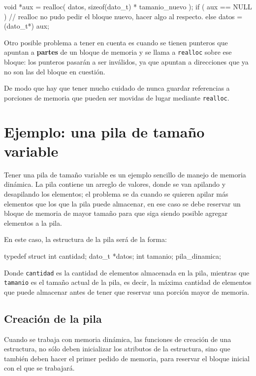\begin{codigo-c-plano}
void *aux = realloc( datos, sizeof(dato_t) * tamanio_nuevo );
if ( aux == NULL ) {
	// realloc no pudo pedir el bloque nuevo, hacer algo al respecto.
} else {
	datos = (dato_t*) aux;
}
\end{codigo-c-plano}

Otro posible problema a tener en cuenta es cuando se tienen punteros que
apuntan a \textbf{partes} de un bloque de memoria y se llama a
\lstinline!realloc! sobre ese bloque: los punteros pasarán a ser inválidos, ya
que apuntan a direcciones que ya no son las del bloque en cuestión.

De modo que hay que tener mucho cuidado de nunca guardar referencias a
porciones de memoria que pueden ser movidas de lugar mediante
\lstinline!realloc!.

\section{Ejemplo: una pila de tamaño variable}

Tener una pila de tamaño variable es un ejemplo sencillo de manejo de memoria
dinámica. La pila contiene un arreglo de valores, donde se van apilando y
desapilando los elementos; el problema se da cuando se quieren apilar más
elementos que los que la pila puede almacenar, en ese caso se debe reservar un
bloque de memoria de mayor tamaño para que siga siendo posible agregar
elementos a la pila.

En este caso, la estructura de la pila será de la forma:

\begin{codigo-c-plano}
typedef struct {
	int cantidad;
	dato_t *datos;
	int tamanio;
} pila_dinamica;
\end{codigo-c-plano}

Donde \lstinline!cantidad! es la cantidad de elementos almacenada en la pila,
mientras que \lstinline!tamanio! es el tamaño actual de la pila, es decir, la
máxima cantidad de elementos que puede almacenar antes de tener que reservar
una porción mayor de memoria.

\subsection{Creación de la pila}

Cuando se trabaja con memoria dinámica, las funciones de creación de una
estructura, no sólo deben inicializar los atributos de la estructura, sino que
también deben hacer el primer pedido de memoria, para reservar el bloque
inicial con el que se trabajará.

